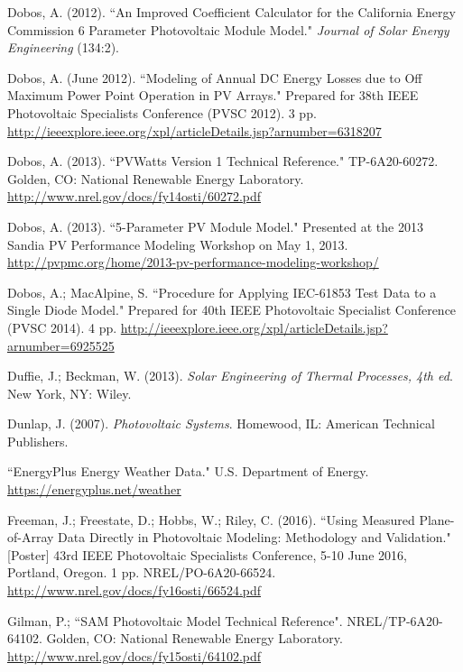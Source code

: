 \documentclass[12pt,letterpaper]{article}
\begin{document}
\begin{thebibliography}{99}
 Dobos, A. (2012). ``An Improved Coefficient Calculator for the California Energy Commission 6 Parameter Photovoltaic Module Model." \textit{Journal of Solar Energy Engineering} (134:2).

 Dobos, A. (June 2012). ``Modeling of Annual DC Energy Losses due to Off Maximum Power Point Operation in PV Arrays." Prepared for 38th IEEE Photovoltaic Specialists Conference (PVSC 2012). 3 pp. \url{http://ieeexplore.ieee.org/xpl/articleDetails.jsp?arnumber=6318207}

 Dobos, A. (2013). ``PVWatts Version 1 Technical Reference." TP-6A20-60272. Golden, CO: National Renewable Energy Laboratory. \url{http://www.nrel.gov/docs/fy14osti/60272.pdf}

 Dobos, A. (2013). ``5-Parameter PV Module Model." Presented at the 2013 Sandia PV Performance Modeling Workshop on May 1, 2013. \url{http://pvpmc.org/home/2013-pv-performance-modeling-workshop/}

 Dobos, A.; MacAlpine, S. ``Procedure for Applying IEC-61853 Test Data to a Single Diode Model." Prepared for 40th IEEE Photovoltaic Specialist Conference (PVSC 2014). 4 pp. \url{http://ieeexplore.ieee.org/xpl/articleDetails.jsp?arnumber=6925525}

 Duffie, J.; Beckman, W. (2013). \textit{Solar Engineering of Thermal Processes, 4th ed}. New York, NY: Wiley.

 Dunlap, J. (2007). \textit{Photovoltaic Systems}. Homewood, IL: American Technical Publishers.

 ``EnergyPlus Energy Weather Data." U.S. Department of Energy. \url{https://energyplus.net/weather}

 Freeman, J.; Freestate, D.; Hobbs, W.; Riley, C. (2016). ``Using Measured Plane-of-Array Data Directly in Photovoltaic Modeling: Methodology and Validation." [Poster] 43rd IEEE Photovoltaic Specialists Conference, 5-10 June 2016, Portland, Oregon. 1 pp. NREL/PO-6A20-66524. \url{http://www.nrel.gov/docs/fy16osti/66524.pdf}

 Gilman, P.; ``SAM Photovoltaic Model Technical Reference". NREL/TP-6A20-64102. Golden, CO: National Renewable Energy Laboratory. \url{http://www.nrel.gov/docs/fy15osti/64102.pdf}


\end{thebibliography}
\end{document}
